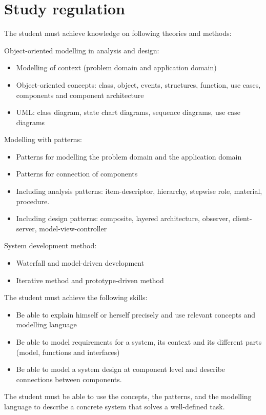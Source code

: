 \chapter{Study regulation}
The student must achieve knowledge on following theories and methods:

\noindent Object-oriented modelling in analysis and design:
\begin{itemize}
    \item Modelling of context (problem domain and application domain) 
    \item Object-oriented concepts: class, object, events, structures, function, use cases, components and component architecture 
    \item UML: class diagram, state chart diagrams, sequence diagrams, use case diagrams 
\end{itemize}

\noindent Modelling with patterns:

\begin{itemize}
    \item Patterns for modelling the problem domain and the application domain 
    \item Patterns for connection of components 
    \item Including analysis patterns: item-descriptor, hierarchy, stepwise role, material, procedure. 
    \item Including design patterns: composite, layered architecture, observer, client-server, model-view-controller 
\end{itemize}

\noindent System development method:

\begin{itemize}
    \item Waterfall and model-driven development
    \item Iterative method and prototype-driven method
\end{itemize}

\noindent The student must achieve the following skills:
\begin{itemize}
    \item Be able to explain himself or herself precisely and use relevant concepts and modelling language
    \item Be able to model requirements for a system, its context and its different parts (model, functions and interfaces) 
    \item Be able to model a system design at component level and describe connections between components. 
\end{itemize}

\noindent The student must be able to use the concepts, the patterns, and the modelling language to describe a concrete system that solves a well-defined task.